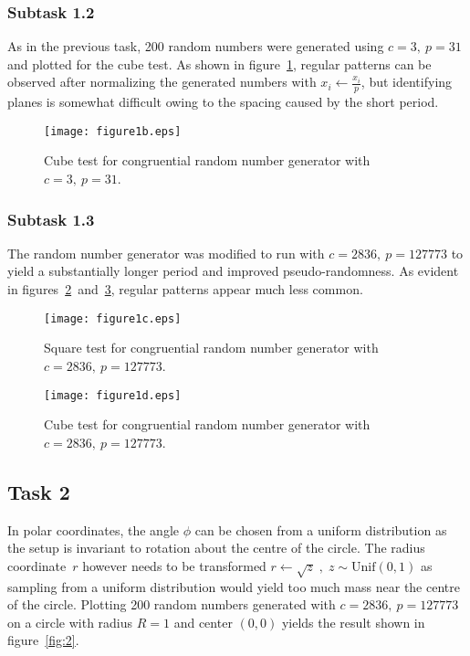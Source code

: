 \documentclass[11pt,a4paper]{article}
\begin{document}
\subsubsection{Subtask 1.2}
As in the previous task, 200 random numbers were generated using $c = 3, \: p = 31$ and plotted for the cube test. As shown in figure~\ref{fig:1b}, regular patterns can be observed after normalizing the generated numbers with $x_i \gets \frac{x_i}{p}$, but identifying planes is somewhat difficult owing to the spacing caused by the short period.

\begin{figure}[ht]
\begin{center}
\texttt{[image: figure1b.eps]} 
\end{center}
\caption{Cube test for congruential random number generator with $c = 3, \: p = 31$.}
\label{fig:1b}
\end{figure}

\subsubsection{Subtask 1.3}
The random number generator was modified to run with $c = 2836, \: p = 127773$ to yield a substantially longer period and improved pseudo-randomness. As evident in figures~\ref{fig:1c}~and~\ref{fig:1d}, regular patterns appear much less common.


\begin{figure}[ht]
\begin{center}
\texttt{[image: figure1c.eps]} 
\end{center}
\caption{Square test for congruential random number generator with $c = 2836, \: p = 127773$.}
\label{fig:1c}
\end{figure}


\begin{figure}[ht]
\begin{center}
\texttt{[image: figure1d.eps]} 
\end{center}
\caption{Cube test for congruential random number generator with $c = 2836, \: p = 127773$.}
\label{fig:1d}
\end{figure}



\subsection{Task 2}
In polar coordinates, the angle $\phi$ can be chosen from a uniform distribution as the setup is invariant to rotation about the centre of the circle. The radius coordinate~$r$ however needs to be transformed $r \gets \sqrt{z} \;, \; z \sim \text{Unif} (0,1) $ as sampling from a uniform distribution would yield too much mass near the centre of the circle. Plotting 200 random numbers generated with $c = 2836, \: p = 127773$ on a circle with radius $R=1$ and center $(0, 0)$ yields the result shown in figure~\ref{fig:2}.
\end{document}
